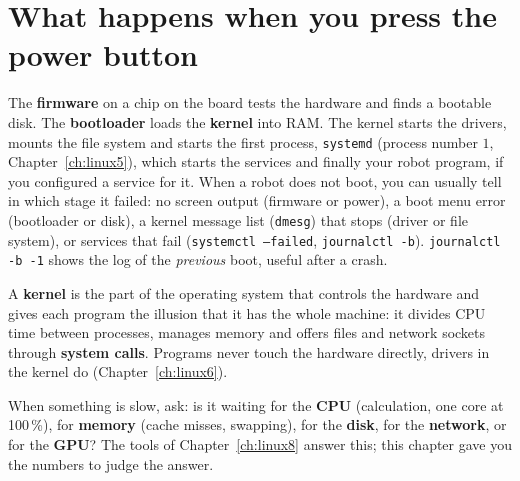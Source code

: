 \section*{What happens when you press the power button}
\begin{center}
\label{fig:hw1_boot}
\end{center}
The \textbf{firmware} on a chip on the board tests the hardware and finds a bootable disk. The \textbf{bootloader} loads the \textbf{kernel} into RAM. The kernel starts the drivers, mounts the file system and starts the first process, \texttt{systemd} (process number $1$, Chapter~\ref{ch:linux5}), which starts the services and finally your robot program, if you configured a service for it. When a robot does not boot, you can usually tell in which stage it failed: no screen output (firmware or power), a boot menu error (bootloader or disk), a kernel message list (\texttt{dmesg}) that stops (driver or file system), or services that fail (\texttt{systemctl --failed}, \texttt{journalctl -b}). \texttt{journalctl -b -1} shows the log of the \emph{previous} boot, useful after a crash.

A \textbf{kernel} is the part of the operating system that controls the hardware and gives each program the illusion that it has the whole machine: it divides CPU time between processes, manages memory and offers files and network sockets through \textbf{system calls}. Programs never touch the hardware directly, drivers in the kernel do (Chapter~\ref{ch:linux6}).

\begin{keyidea}
When something is slow, ask: is it waiting for the \textbf{CPU} (calculation, one core at 100\,\%), for \textbf{memory} (cache misses, swapping), for the \textbf{disk}, for the \textbf{network}, or for the \textbf{GPU}? The tools of Chapter~\ref{ch:linux8} answer this; this chapter gave you the numbers to judge the answer.
\end{keyidea}

